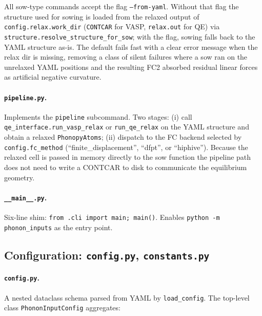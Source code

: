 All sow-type commands accept the flag \texttt{--from-yaml}.  Without
that flag the structure used for sowing is loaded from the relaxed
output of \texttt{config.relax.work\_dir} (\texttt{CONTCAR} for VASP,
\texttt{relax.out} for QE) via
\texttt{structure.resolve\_structure\_for\_sow}; with the flag, sowing
falls back to the YAML structure as-is.  The default fails fast with a
clear error message when the relax dir is missing, removing a class
of silent failures where a sow ran on the unrelaxed YAML positions and
the resulting FC2 absorbed residual linear forces as artificial
negative curvature.

\paragraph{\texttt{pipeline.py}.}  Implements the \texttt{pipeline}
subcommand.  Two stages: (i) call \texttt{qe\_interface.run\_vasp\_relax}
or \texttt{run\_qe\_relax} on the YAML structure and obtain a relaxed
\texttt{PhonopyAtoms}; (ii) dispatch to the FC backend selected by
\texttt{config.fc\_method} (``finite\_displacement'', ``dfpt'', or
``hiphive'').  Because the relaxed cell is passed in memory directly to
the sow function the pipeline path does not need to write a CONTCAR to
disk to communicate the equilibrium geometry.

\paragraph{\texttt{\_\_main\_\_.py}.}  Six-line shim:
\texttt{from .cli import main; main()}.  Enables
\texttt{python -m phonon\_inputs} as the entry point.

\subsection{Configuration: \texttt{config.py}, \texttt{constants.py}}
\label{sec:pinputs_config}

\paragraph{\texttt{config.py}.}  A nested dataclass schema parsed from
YAML by \texttt{load\_config}.  The top-level class
\texttt{PhononInputConfig} aggregates:

